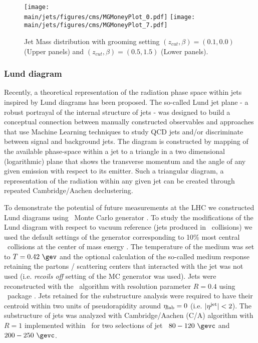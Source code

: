 %
\begin{figure}[!ht]
\begin{center}
\texttt{[image: \\main/jets/figures/cms/MGMoneyPlot\_0.pdf]}
\texttt{[image: \\main/jets/figures/cms/MGMoneyPlot\_7.pdf]}
\caption{Jet Mass distribution with grooming setting $(z_{cut},\beta)=(0.1,0.0)$ (Upper panels) and $(z_{cut},\beta)=(0.5,1.5)$ (Lower panels). \cite{CMS-FTR-17-002:2017dec}}
\label{fig:Mass}
\end{center}
\end{figure}


\newpage
\subsubsection{Lund diagram}

Recently, a theoretical representation of the radiation phase space within jets inspired by Lund diagrams \cite{Andersson:1988gp} has been proposed. The so-called Lund jet plane \cite{Dreyer:2018nbf} - a robust portrayal of the internal structure of jets - was designed to build a conceptual connection between manually constructed observables and approaches that use Machine Learning techniques to study QCD jets and/or discriminate between signal and background jets.
The diagram is constructed by mapping of the available phase-space within a jet to a triangle in a two dimensional (logarithmic) plane that shows the transverse momentum and the angle of any given emission with respect to its emitter.
Such a triangular diagram, a representation of the radiation within any given jet can be created through repeated Cambridge/Aachen declustering.

To demonstrate the potential of future measurements at the LHC we constructed Lund diagrams using \jewel\ Monte Carlo generator \cite{Zapp:2013vla}.
To study the modifications of the Lund diagram with respect to vacuum reference (jets produced in \pp\ collisions) we used the default settings of the generator corresponding to 10\% most central \PbPb\ collisions at the center of mass energy .
The temperature of the medium was set to $T=0.42~\gev$ and the optional calculation of the so-called medium response retaining the partons / scattering centers that interacted with the jet was not used (i.e. {\it recoils off} setting of the MC generator was used).
Jets were reconstructed with the \akt\ algorithm \cite{Cacciari:2008gp} with resolution parameter $R=0.4$ using \fastjet\ package \cite{Cacciari:2011ma,Cacciari:2005hq}.
Jets retained for the substructure analysis were required to have their centroid within two units of pseudorapidity around $\eta_{\rm lab}=0$ (i.e. $|\eta^{\rm jet}| < 2$).
The substructure of jets was analyzed with Cambridge/Aachen (C/A) algorithm with $R=1$ implemented within \fastjet\ for two selections of jet \pt\ $80-120~\gevc$ and $200-250~\gevc$.


